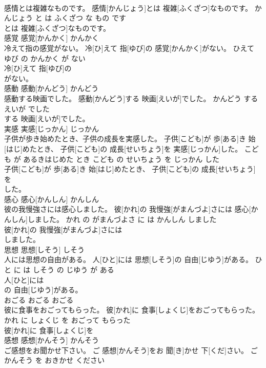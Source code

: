 \documentclass[8pt]{extreport}
\begin{document}
\begin{CJK}{UTF8}{min}
\\	感情とは複雑なものです。	感情[かんじょう]とは 複雑[ふくざつ]なものです。	かんじょう と は ふくざつ な もの です	
\\	とは 複雑[ふくざつ]なものです。			
\\	感覚	感覚[かんかく]	かんかく	
\\	冷えて指の感覚がない。	冷[ひ]えて 指[ゆび]の 感覚[かんかく]がない。	ひえて ゆび の かんかく が ない	
\\	冷[ひ]えて 指[ゆび]の
\\	がない。			
\\	感動	感動[かんどう]	かんどう	
\\	感動する映画でした。	感動[かんどう]する 映画[えいが]でした。	かんどう する えいが でした	
\\	する 映画[えいが]でした。			
\\	実感	実感[じっかん]	じっかん	
\\	子供が歩き始めたとき、子供の成長を実感した。	子供[こども]が 歩[ある]き 始[はじ]めたとき、 子供[こども]の 成長[せいちょう]を 実感[じっかん]した。	こども が あるきはじめた とき こども の せいちょう を じっかん した	
\\	子供[こども]が 歩[ある]き 始[はじ]めたとき、 子供[こども]の 成長[せいちょう]を
\\	した。			
\\	感心	感心[かんしん]	かんしん	
\\	彼の我慢強さには感心しました。	彼[かれ]の 我慢強[がまんづよ]さには 感心[かんしん]しました。	かれ の がまんづよさ に は かんしん しました	
\\	彼[かれ]の 我慢強[がまんづよ]さには
\\	しました。			
\\	思想	思想[しそう]	しそう	
\\	人には思想の自由がある。	人[ひと]には 思想[しそう]の 自由[じゆう]がある。	ひと に は しそう の じゆう が ある	
\\	人[ひと]には
\\	の 自由[じゆう]がある。			
\\	おごる	おごる	おごる	
\\	彼に食事をおごってもらった。	彼[かれ]に 食事[しょくじ]をおごってもらった。	かれ に しょくじ を おごって もらった	
\\	彼[かれ]に 食事[しょくじ]を
\\	感想	感想[かんそう]	かんそう	
\\	ご感想をお聞かせ下さい。	ご 感想[かんそう]をお 聞[き]かせ 下[くだ]さい。	ごかんそう を おきかせ ください	

\end{CJK}
\end{document}
